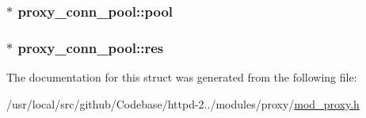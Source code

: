 \subsubsection[{\texorpdfstring{pool}{pool}}]{$\ast$ proxy\+\_\+conn\+\_\+pool\+::pool}\hypertarget{structproxy__conn__pool_aa683a756f120a4482de8289705ff5faa}{}\label{structproxy__conn__pool_aa683a756f120a4482de8289705ff5faa}
\subsubsection[{\texorpdfstring{res}{res}}]{$\ast$ proxy\+\_\+conn\+\_\+pool\+::res}\hypertarget{structproxy__conn__pool_ae3659e08b0bf0f25be12f5e71a676c1d}{}\label{structproxy__conn__pool_ae3659e08b0bf0f25be12f5e71a676c1d}


The documentation for this struct was generated from the following file\+:\begin{DoxyCompactItemize}
\item 
/usr/local/src/github/\+Codebase/httpd-\/2../modules/proxy/\hyperlink{mod__proxy_8h}{mod\+\_\+proxy.\+h}\end{DoxyCompactItemize}
